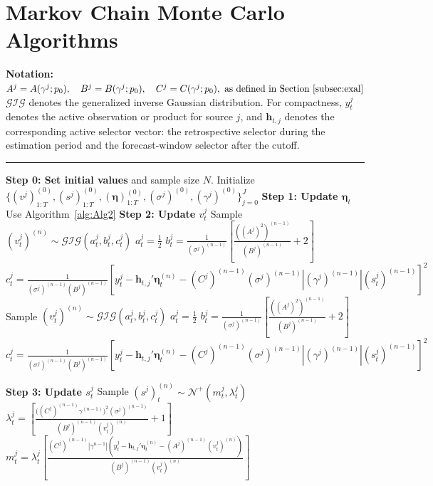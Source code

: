 \documentclass[APA,STIX1COL]{WileyNJD-v2}
\begin{document}
\section{Markov Chain Monte Carlo Algorithms}
\begin{algorithm}
\caption{MCMC Algorithm}\label{alg1}
\begin{algorithmic}

\State \textbf{Notation:}
\State  \(
A^j = A(\gamma^j;p_0), \quad B^j = B(\gamma^j;p_0), \quad C^j = C(\gamma^j;p_0), \text{ as defined in Section~\ref{subsec:exal}}
\)
\State \(\mathcal{GIG}\) denotes the generalized inverse Gaussian distribution.
\State For compactness, \(y_t^j\) denotes the active observation or product for source \(j\), and \(\mathbf{h}_{t,j}\) denotes the corresponding active selector vector: the retrospective selector during the estimation period and the forecast-window selector after the cutoff.
\vspace{0.1cm}
\Statex \rule{\linewidth}{0.4pt}
\vspace{0.1cm}


\State \textbf{Step 0: Set initial values} and sample size $N$.
\State Initialize $\{(v^j)^{(0)}_{1:T}, (s^j)^{(0)}_{1:T}, (\boldsymbol{\eta})^{(0)}_{1:T}, (\sigma^j)^{(0)}, (\gamma^j)^{(0)}\}_{j=0}^J$
    \State \textbf{Step 1: Update $\boldsymbol{\eta}_t$}
    \State Use Algorithm~\ref{alg:Alg2}
        \State \textbf{Step 2: Update $v^j_t$}
            \State Sample $(v^j_t)^{(n)} \sim \mathcal{GIG}(a^j_t, b^j_t, c^j_t)$
            \State $a^j_t = \frac{1}{2}$
            \State $b^j_t = \frac{1}{(\sigma^j)^{(n-1)}}\left[ \frac{((A^j)^2)^{(n-1)}}{(B^j)^{(n-1)}}+2\right]$
            \State $c^j_t = \frac{1}{(\sigma^j)^{(n-1)} (B^j)^{(n-1)}}\left[y_t^j -\textbf{h}_{t,j}' \boldsymbol{\eta}^{(n)}_t -(C^j)^{(n-1)} (\sigma^j)^{(n-1)} |(\gamma^j)^{(n-1)}| (s^j_t)^{(n-1)} \right]^2$
        \EndFor
            \State Sample $(v^j_t)^{(n)} \sim \mathcal{GIG}(a^j_t, b^j_t, c^j_t)$
            \State $a^j_t = \frac{1}{2}$
            \State $b^j_t = \frac{1}{(\sigma^j)^{(n-1)}}\left[ \frac{((A^j)^2)^{(n-1)}}{(B^j)^{(n-1)}}+2\right]$
            \State $c^j_t = \frac{1}{(\sigma^j)^{(n-1)} (B^j)^{(n-1)}}\left[y_t^j -\textbf{h}_{t,j}' \boldsymbol{\eta}^{(n)}_t -(C^j)^{(n-1)} (\sigma^j)^{(n-1)} |(\gamma^j)^{(n-1)}| (s^j_t)^{(n-1)} \right]^2$
        \EndFor

        \State \textbf{Step 3: Update $s^j_t$}
            \State Sample $(s^j)^{(n)}_t \sim \mathcal{N}^+(m^j_t, \lambda^j_t)$
            \State $\lambda^j_t =  \left[\frac{\big((C^j)^{(n-1)}\gamma^{(n-1)} \big)^2(\sigma^j)^{(n-1)}}{(B^j)^{(n-1)}(v^j_t)^{(n)}}+1\right]$
            \State $m^j_t =  \lambda^j_t \left[\frac{(C^j)^{(n-1)}|\gamma^{n-1}|(y_t^j -\textbf{h}_{t,j}' \boldsymbol{\eta}^{(n)}_t - (A^j)^{(n-1)} (v^j_t)^{(n)})}{(B^j)^{(n-1)}(v^j_t)^{(n)}}\right]$
        \EndFor


\end{algorithmic}
\end{algorithm}
\end{document}
